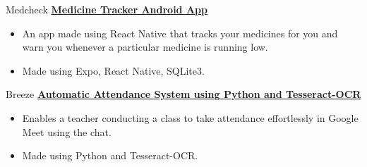 {Medcheck}
{\href{https://github.com/confumbit/medcheck}{\textbf{Medicine Tracker Android App}}}
{
    \begin{itemize}
        \item An app made using React Native that tracks your medicines for you and warn you whenever a particular medicine is running low.
        \item Made using Expo, React Native, SQLite3.
    \end{itemize}
}
{Breeze}
{\href{https://github.com/confumbit/Breeze}{\textbf{Automatic Attendance System using Python and
            Tesseract-OCR}}}
{
    \begin{itemize}
        \item Enables a teacher conducting a class to take attendance effortlessly in Google Meet using the chat.
        \item Made using Python and Tesseract-OCR.
    \end{itemize}
}